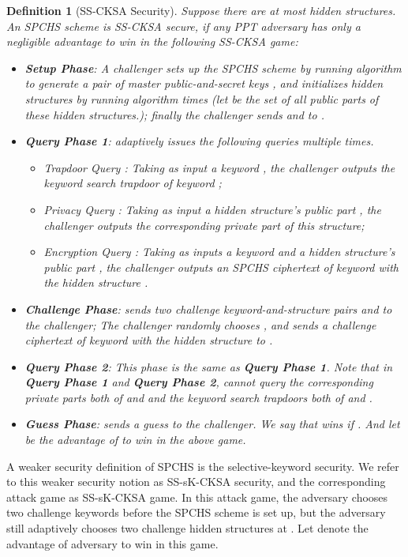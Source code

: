 \documentclass[10pt,twocolumn,twoside]{IEEEtran}
\newtheorem{definition}{Definition}
\begin{document}
\begin{definition}[SS-CKSA Security]\label{D.SPCHS.Security}
Suppose there are at most  hidden structures. An SPCHS scheme is SS-CKSA secure,
if any PPT adversary  has only a negligible advantage   to win in the following SS-CKSA game:

\begin{itemize}
\item \textbf{Setup Phase}: A challenger sets up the SPCHS scheme by running algorithm  to generate a pair of master public-and-secret keys , and initializes  hidden structures by running algorithm   times (let  be the set of all public parts of these  hidden structures.); finally the
challenger sends  and  to .
\item \textbf{Query Phase 1}:  adaptively issues the following queries multiple times.
	\begin{itemize}
	 \item Trapdoor Query : Taking as input a keyword , the challenger outputs the keyword search trapdoor of keyword ;
	\item Privacy Query : Taking as input a hidden structure's public part , the challenger outputs the corresponding private part of this structure;
	\item Encryption Query : Taking as inputs a keyword  and a hidden structure's public part , the challenger outputs an SPCHS ciphertext of keyword  with the hidden structure .
     \end{itemize}
\item \textbf{Challenge Phase}:  sends two challenge keyword-and-structure pairs  and  to the challenger; The challenger randomly chooses , and sends a challenge ciphertext  of keyword  with the hidden structure  to .
\item \textbf{Query Phase 2}: This phase is the same as \textbf{Query Phase 1}. Note that in \textbf{Query Phase 1} and \textbf{Query Phase 2},  cannot query the corresponding private parts both of  and  and the keyword search trapdoors both of  and .
\item \textbf{Guess Phase}:  sends a guess  to the challenger. We say that  wins if . And let  be the advantage of  to win in the above game.
\end{itemize}
\end{definition}

A weaker security definition of SPCHS is the selective-keyword security. We refer to this weaker security notion as SS-sK-CKSA security, and the corresponding attack game as SS-sK-CKSA game. In this attack game, the adversary  chooses two challenge keywords before the SPCHS scheme is set up, but the adversary still adaptively chooses two challenge hidden structures at . Let  denote the advantage of adversary  to win in this game.
\end{document}
